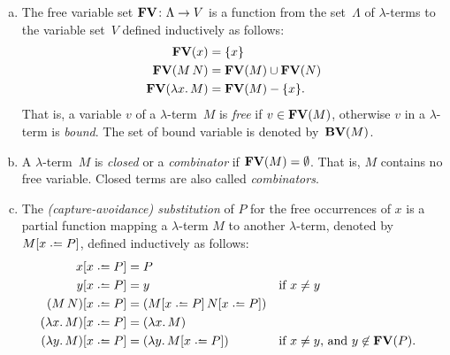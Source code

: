 \begin{definition}
  \begin{enumerate}[(a)]
    \item The free variable set $\mathbf{FV}\colon \Lambda \to V$ is a function from the
      set~$\Lambda$ of $\lambda$-terms to the variable set~$V$ defined
      inductively as follows:
      \begin{align*}
        \mathbf{FV}(x) & = \{ x \} \\
        \mathbf{FV}(M\, N) & = \mathbf{FV}(M) \cup \mathbf{FV}(N) \\
        \mathbf{FV}(\lambda x.\, M) & = \mathbf{FV}(M) - \{ x \}.
      \end{align*}
      That is, a variable $v$ of a $\lambda$-term~$M$ is \emph{free} if $v \in
      \mathbf{FV}(M)$, otherwise $v$ in a $\lambda$-term is
      \emph{bound}. The set of bound variable is denoted by~$\mathbf{BV}(M)$.
    \item A $\lambda$-term~$M$ is \emph{closed} or a
      \emph{combinator} if $\mathbf{FV}(M) = \emptyset$. That
      is, $M$ contains no free variable. Closed terms are also called
      \emph{combinators}.
    \item The \emph{(capture-avoidance) substitution} of $P$ for the free occurrences of $x$ is a
      partial function mapping a $\lambda$-term $M$ to another $\lambda$-term,
      denoted by $M\subst{x}{P}$, defined inductively as follows:
      \begin{align*}
        x\subst{x}{P} & = P \\
        y\subst{x}{P} & = y && \text{if $x \neq y$} \\
        (M\, N)\subst{x}{P} & = (M\subst{x}{P}\, N\subst{x}{P}) \\
        (\lambda x.\, M)\subst{x}{P} & = (\lambda x.\, M) \\
        (\lambda y.\, M)\subst{x}{P} & = (\lambda y.\, M\subst x P)
        && \text{if $x \neq y$, and $y \not\in \FV(P)$.}\\
      \end{align*}
  \end{enumerate}
\end{definition}

